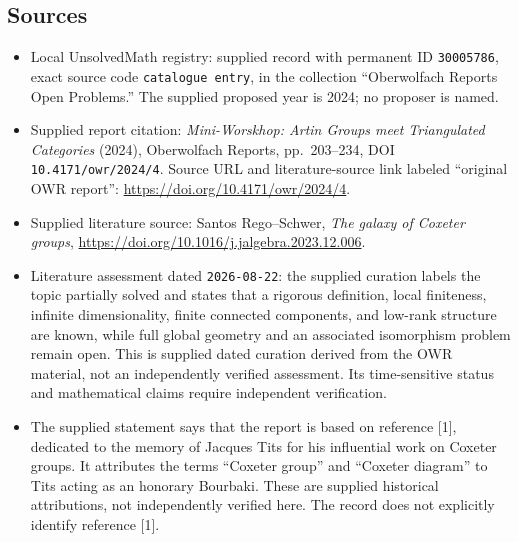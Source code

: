 \documentclass[11pt]{article}
\begin{document}
\subsection{Sources}
\begin{itemize}
\item Local UnsolvedMath registry: supplied record with permanent ID \texttt{30005786}, exact source code \texttt{catalogue entry}, in the collection ``Oberwolfach Reports Open Problems.'' The supplied proposed year is 2024; no proposer is named.
\item Supplied report citation: \emph{Mini-Worskhop: Artin Groups meet Triangulated Categories} (2024), Oberwolfach Reports, pp.\ 203--234, DOI \texttt{10.4171/owr/2024/4}. Source URL and literature-source link labeled ``original OWR report'': \url{https://doi.org/10.4171/owr/2024/4}.
\item Supplied literature source: Santos Rego--Schwer, \emph{The galaxy of Coxeter groups}, \url{https://doi.org/10.1016/j.jalgebra.2023.12.006}.
\item Literature assessment dated \texttt{2026-08-22}: the supplied curation labels the topic partially solved and states that a rigorous definition, local finiteness, infinite dimensionality, finite connected components, and low-rank structure are known, while full global geometry and an associated isomorphism problem remain open. This is supplied dated curation derived from the OWR material, not an independently verified assessment. Its time-sensitive status and mathematical claims require independent verification.
\item The supplied statement says that the report is based on reference [1], dedicated to the memory of Jacques Tits for his influential work on Coxeter groups. It attributes the terms ``Coxeter group'' and ``Coxeter diagram'' to Tits acting as an honorary Bourbaki. These are supplied historical attributions, not independently verified here. The record does not explicitly identify reference [1].
\end{itemize}
\end{document}
